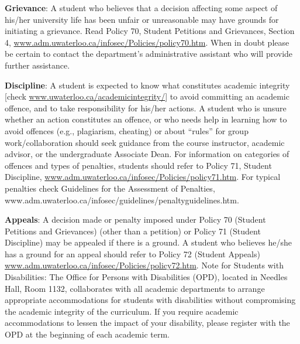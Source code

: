 \documentclass{article}
\begin{document}
\vspace*{1em}\noindent
{\bf Grievance}: A student who believes that a decision affecting some
aspect of his/her university life has been unfair or unreasonable may
have grounds for initiating a grievance. Read Policy 70, Student
Petitions and Grievances, Section 4,
\url{www.adm.uwaterloo.ca/infosec/Policies/policy70.htm}.  When in doubt
please be certain to contact the department’s administrative assistant
who will provide further assistance.

\vspace*{1em}\noindent
{\bf Discipline}: A student is expected to know what constitutes academic
integrity [check \url{www.uwaterloo.ca/academicintegrity/}] to avoid
committing an academic offence, and to take responsibility for his/her
actions. A student who is unsure whether an action constitutes an
offence, or who needs help in learning how to avoid offences (e.g.,
plagiarism, cheating) or about “rules” for group work/collaboration
should seek guidance from the course instructor, academic advisor, or
the undergraduate Associate Dean. For information on categories of
offences and types of penalties, students should refer to Policy 71,
Student Discipline,
\url{www.adm.uwaterloo.ca/infosec/Policies/policy71.htm}. For typical
penalties check Guidelines for the Assessment of Penalties,
www.adm.uwaterloo.ca/infosec/guidelines/penaltyguidelines.htm.

\vspace*{1em}\noindent
{\bf Appeals}: A decision made or penalty imposed under Policy 70 (Student
Petitions and Grievances) (other than a petition) or Policy 71
(Student Discipline) may be appealed if there is a ground. A student
who believes he/she has a ground for an appeal should refer to Policy
72 (Student Appeals)
\url{www.adm.uwaterloo.ca/infosec/Policies/policy72.htm}.  Note for Students
with Disabilities: The Office for Persons with Disabilities (OPD),
located in Needles Hall, Room 1132, collaborates with all academic
departments to arrange appropriate accommodations for students with
disabilities without compromising the academic integrity of the
curriculum. If you require academic accommodations to lessen the
impact of your disability, please register with the OPD at the
beginning of each academic term.
\end{document}
